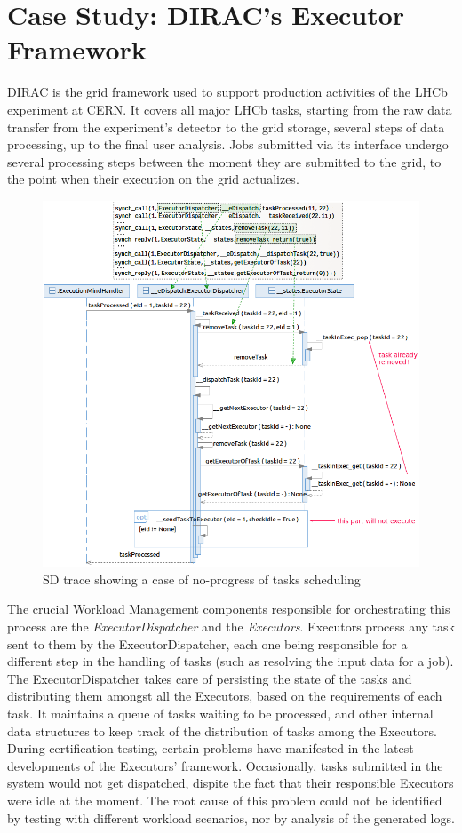 \documentclass[letter]{llncs}
\newcommand{\figshrink}{\vspace{-.6cm}}
\newcommand{\figshrinkend}{}
\begin{document}
\section{Case Study: DIRAC’s Executor Framework}
\label{sec:Application}
DIRAC \cite{DIRAC_CommGridSolution} is the grid framework used to support production activities of the LHCb experiment at CERN.
It covers all major LHCb tasks, starting from the raw data transfer from the experiment’s detector to the grid storage, several steps of data processing, up
to the final user analysis.
Jobs submitted via its interface undergo several processing steps between the moment they are submitted to the grid, 
to the point when their execution on the grid actualizes. 
\begin{figure}[!t]
\centering
\figshrink
\includegraphics[width=1.0\linewidth,keepaspectratio=true]{./TraceNew1.png}
\caption{SD trace showing a case of no-progress of tasks scheduling}
\label{fig:noProgress}
\figshrinkend
\end{figure}
The crucial Workload Management components responsible for orchestrating this process are the \emph{ExecutorDispatcher} and 
the \emph{Executors}. Executors process any task sent to them by the ExecutorDispatcher, each one being responsible for a different step in the handling of tasks
(such as resolving the input data for a job).
The ExecutorDispatcher takes care of persisting the state of the tasks and distributing them amongst all the Executors, based on the
requirements of each task. It maintains a queue of tasks waiting to be processed, and other internal data structures to keep track
of the distribution of tasks among the Executors.
During certification testing, certain problems have manifested in the latest developments of the Executors' framework.
Occasionally, tasks submitted in the system would not get dispatched, dispite the fact that their responsible Executors
were idle at the moment.
The root cause of this problem could not be identified by testing  with different workload scenarios, nor by analysis of the 
generated logs. 
\end{document}
